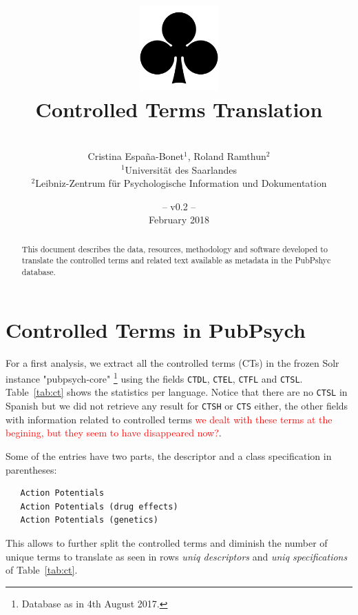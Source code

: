 \documentclass[a4paper,11pt]{article}
\title{
\includegraphics[width=3cm]{./img/200px-SuitClubs.png} \\
\Huge Controlled Terms Translation \\ 
}
\author{\vspace*{1cm}\\ \LARGE Cristina Espa\~na-Bonet$^{1}$, Roland Ramthun$^{2}$ \medskip \\ 
                        \Large $^{1}$Universit\"at des Saarlandes\\ \Large $^{2}$Leibniz-Zentrum für Psychologische Information und Dokumentation}
\date{\vspace*{2cm} -- v0.2 --\\February 2018}
\newcommand{\red}[1]{\textcolor{red}{#1}}
\begin{document}
\clearpage\maketitle
\thispagestyle{empty}

\vspace*{5cm}
\begin{abstract}
This document describes the data, resources, methodology and software developed to translate the controlled terms and related text available as metadata in the PubPshyc database.
\end{abstract}

\newpage
\tableofcontents
\clearpage



\section{Controlled Terms in PubPsych}
\label{s:ct}

For a first analysis, we extract all the controlled terms (CTs) in the frozen Solr instance "pubpsych-core"%
\footnote{Database as in 4th August 2017.}  using the fields {\tt CTDL}, {\tt CTEL}, {\tt CTFL} and {\tt CTSL}. Table~\ref{tab:ct} shows the statistics per language. Notice that there are no {\tt CTSL} in Spanish but we did not retrieve any result for {\tt CTSH} or {\tt CTS} either, the other fields with information related to controlled terms \red{we dealt with these terms at the begining, but they seem to have disappeared now?}.

Some of the entries have two parts, the descriptor and a class specification in parentheses:
{\small 
\begin{verbatim}
   Action Potentials
   Action Potentials (drug effects)
   Action Potentials (genetics)
\end{verbatim}
}

This allows to further split the controlled terms and diminish the number of unique terms to translate as seen in rows \emph{uniq descriptors} and \emph{uniq specifications} of Table~\ref{tab:ct}.
\end{document}
